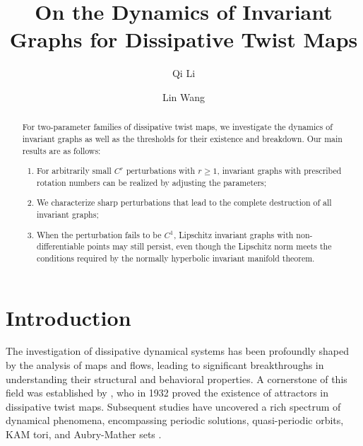 \documentclass{amsart}
\theoremstyle{definition}
\begin{document}
\title[Invariant Graphs for Dissipative Twist Maps]{  On the Dynamics of Invariant Graphs for Dissipative Twist Maps }

\author{Qi Li}
\address{School of Mathematics and Statistics, Beijing Institute of Technology, Beijing 100081, China}

\author{Lin Wang}
\address{School of Mathematics and Statistics, Beijing Institute of Technology, Beijing 100081, China}





\begin{abstract}
For two-parameter families of dissipative twist maps, we investigate the dynamics of invariant graphs as well as the thresholds for their existence and breakdown. Our main results are as follows:
\begin{enumerate}
    \item For arbitrarily small $C^r$ perturbations with $r \geq 1$, invariant graphs with prescribed rotation numbers can be realized by adjusting the parameters;

    \item We characterize sharp perturbations that lead to the complete destruction of all invariant graphs;

    \item When the perturbation fails to be $C^1$, Lipschitz invariant graphs with non-differentiable points may still persist, even though the Lipschitz norm meets the conditions required by the normally hyperbolic invariant manifold theorem.
\end{enumerate}

\end{abstract}



\maketitle



\tableofcontents
	\section{\sc Introduction}
The investigation of dissipative dynamical systems has been profoundly shaped by the analysis of maps and flows, leading to significant breakthroughs in understanding their structural and behavioral properties. A cornerstone of this field was established by \cite{B}, who in 1932 proved the existence of attractors in dissipative twist maps. Subsequent studies have uncovered a rich spectrum of dynamical phenomena, encompassing periodic solutions, quasi-periodic orbits, KAM tori, and Aubry-Mather sets \cite{CCD1,CCD2,Ca,L1,Ma,MS}.
\end{document}
